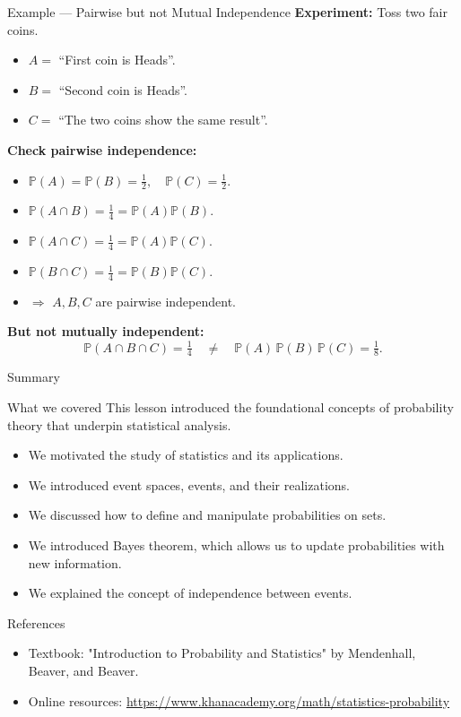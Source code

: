 \documentclass{beamer}
\newcommand{\1}{\mathbf{1}}
\begin{document}
\begin{frame}{Example — Pairwise but not Mutual Independence}
  \small
  \textbf{Experiment:} Toss two fair coins.

  \begin{itemize}
    \item $A =$ “First coin is Heads”.
    \item $B =$ “Second coin is Heads”.
    \item $C =$ “The two coins show the same result”.
  \end{itemize}

  \textbf{Check pairwise independence:}
  \begin{itemize}
    \item $\mathbb{P}(A)=\mathbb{P}(B)=\tfrac{1}{2}, \quad \mathbb{P}(C)=\tfrac{1}{2}$.
    \item $\mathbb{P}(A \cap B)=\tfrac{1}{4} = \mathbb{P}(A)\mathbb{P}(B)$.
    \item $\mathbb{P}(A \cap C)=\tfrac{1}{4} = \mathbb{P}(A)\mathbb{P}(C)$.
    \item $\mathbb{P}(B \cap C)=\tfrac{1}{4} = \mathbb{P}(B)\mathbb{P}(C)$.
    \item $\Rightarrow$ $A, B, C$ are pairwise independent.
  \end{itemize}

  \textbf{But not mutually independent:}
  \[
    \mathbb{P}(A \cap B \cap C) = \tfrac{1}{4}
    \quad \neq \quad
    \mathbb{P}(A)\,\mathbb{P}(B)\,\mathbb{P}(C) = \tfrac{1}{8}.
  \]
\end{frame}

\begin{frame}{Summary}
  \begin{exampleblock}{What we covered}
    This lesson introduced the foundational concepts of probability theory that underpin statistical analysis.
    \bigskip

    \begin{itemize}
      \item We motivated the study of statistics and its applications.
        \medskip
      \item We introduced event spaces, events, and their realizations.
        \medskip
      \item We discussed how to define and manipulate probabilities on sets.
        \medskip
      \item We introduced Bayes theorem, which allows us to update probabilities with new information.
        \medskip
      \item We explained the concept of independence between events.
    \end{itemize}

  \end{exampleblock}
\end{frame}

\begin{frame}{References}
  \begin{itemize}
    \item Textbook: "Introduction to Probability and Statistics" by Mendenhall, Beaver, and Beaver.
    \item Online resources: \url{https://www.khanacademy.org/math/statistics-probability}
  \end{itemize}
\end{frame}

\end{document}
